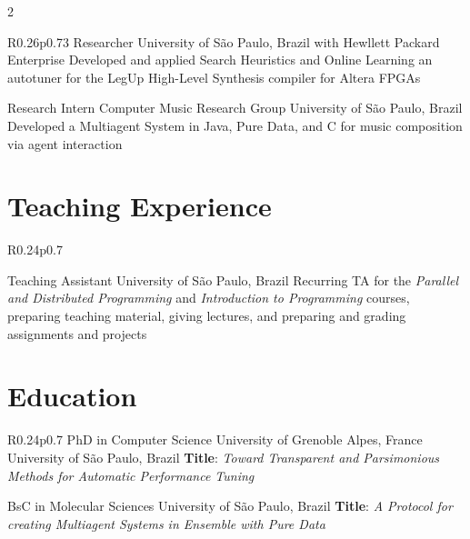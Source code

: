 \documentclass[a4paper,10pt]{article}
\begin{document}
\begin{paracol}{2}
\begin{tabular}{R{0.26\linewidth}p{0.73\linewidth}}
    {Researcher}
    {University of São Paulo, Brazil}
    {with Hewllett Packard Enterprise}
    {Developed and  applied Search Heuristics  and Online Learning  an autotuner
      for the LegUp High-Level Synthesis compiler for Altera FPGAs}

    {Research Intern}
    {Computer Music Research Group}
    {University of São Paulo, Brazil}
    {Developed  a  Multiagent  System  in  Java, Pure  Data,  and  C  for  music
      composition via agent interaction}

\end{tabular}

\switchcolumn %
\smallskip %
\section{Teaching Experience}
\label{sec:org4072f0d}
\begin{tabular}{R{0.24\linewidth}p{0.7\linewidth}}

    {Teaching Assistant}
    {}
    {University of São Paulo, Brazil}
    {Recurring  TA for  the  \textit{Parallel and  Distributed Programming}  and
      \textit{Introduction to Programming} courses, preparing teaching material,
      giving lectures, and preparing and grading assignments and projects}

\end{tabular}

\smallskip %
\section{Education}
\label{sec:orga18ab47}
\begin{tabular}{R{0.24\linewidth}p{0.7\linewidth}}
    {PhD in Computer Science}
    {University of Grenoble Alpes, France}
    {University of São Paulo, Brazil}
    {\textbf{Title}:  \textit{Toward Transparent  and  Parsimonious Methods  for
        Automatic Performance Tuning}}

    {BsC in Molecular Sciences}
    {}
    {University of São Paulo, Brazil}
    {\textbf{Title}:  \textit{A  Protocol  for creating  Multiagent  Systems  in
        Ensemble with Pure Data}}


\end{tabular}
\end{paracol}
\end{document}
